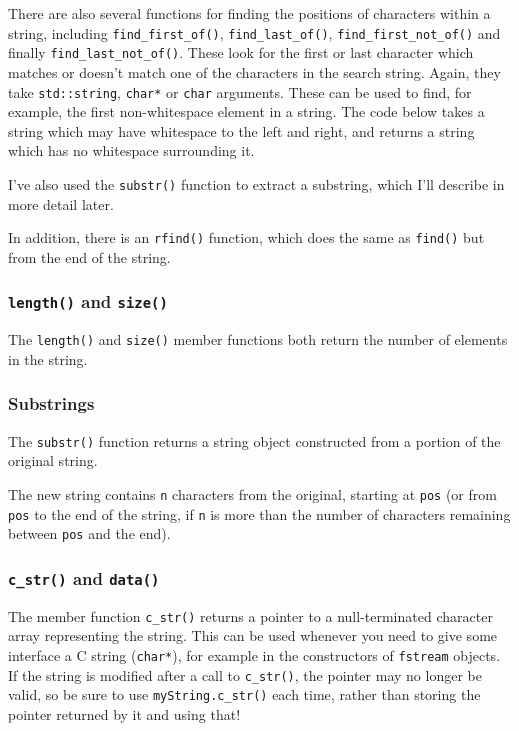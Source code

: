 \documentclass[a4paper]{scrartcl}
\begin{document}
There are also several functions for finding the positions of characters within a string, including \texttt{find\_first\_of()}, \texttt{find\_last\_of()}, \texttt{find\_first\_not\_of()} and finally \texttt{find\_last\_not\_of()}. These look for the first or last character which matches or doesn't match one of the characters in the search string. Again, they take \texttt{std::string}, \texttt{char*} or \texttt{char} arguments. These can be used to find, for example, the first non-whitespace element in a string. The code below takes a string which may have whitespace to the left and right, and returns a string which has no whitespace surrounding it.


I've also used the \texttt{substr()} function to extract a substring, which I'll describe in more detail later.

In addition, there is an \texttt{rfind()} function, which does the same as \texttt{find()} but from the end of the string.

\subsubsection{\texttt{length()} and \texttt{size()}}
The \texttt{length()} and \texttt{size()} member functions both return the number of elements in the string.

\subsubsection{Substrings}
The \texttt{substr()} function returns a string object constructed from a portion of the original string.


The new string contains \texttt{n} characters from the original, starting at \texttt{pos} (or from \texttt{pos} to the end of the string, if \texttt{n} is more than the number of characters remaining between \texttt{pos} and the end).

\subsubsection{\texttt{c\_str()} and \texttt{data()}}
The member function \texttt{c\_str()} returns a pointer to a null-terminated character array representing the string. This can be used whenever you need to give some interface a C string (\texttt{char*}), for example in the constructors of \texttt{fstream} objects. If the string is modified after a call to \texttt{c\_str()}, the pointer may no longer be valid, so be sure to use \texttt{myString.c\_str()} each time, rather than storing the pointer returned by it and using that!
\end{document}
